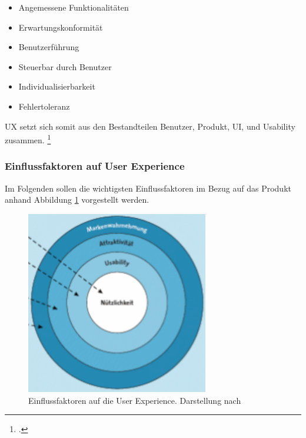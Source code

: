 \begin{multicols}{2}
    \begin{itemize}
        \singlespacing
        \item Angemessene Funktionalitäten
        \item Erwartungskonformität
        \item Benutzerführung
        \item Steuerbar durch Benutzer
        \item Individualisierbarkeit
        \item Fehlertoleranz
    \end{itemize}
    \end{multicols}

UX setzt sich somit aus den Bestandteilen Benutzer, Produkt, UI, und Usability zusammen. \footcite[Vgl.][S. 27]{theorie_beyer_user_experience_mit_sap_2020}

\subsubsection{Einflussfaktoren auf User Experience}

Im Folgenden sollen die wichtigsten Einflussfaktoren im Bezug auf das Produkt anhand Abbildung \ref{fig:User-Experience_Einflussfaktoren} vorgestellt werden.

\begin{figure}[H]
    \centering
    \includegraphics[height=8cm]{Bilder/User-Experience_Einflussfaktoren.png}
    \caption[Einflussfaktoren auf die User Experience]{Einflussfaktoren auf die User Experience. Darstellung nach \cite{theorie_beyer_user_experience_mit_sap_2020}}
    \label{fig:User-Experience_Einflussfaktoren}
\end{figure}

